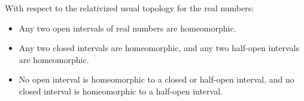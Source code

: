 With respect to the relativized usual topology for the real numbers:
\begin{itemize}
\item[(a)] Any two open intervals of real numbers are homeomorphic.
\item[(b)] Any two closed intervals are homeomorphic, and any two half-open intervals are homeomorphic.
\item[(c)] No open interval is homeomorphic to a closed or half-open interval, and no closed interval is homeomorphic to a half-open interval.
\end{itemize}
